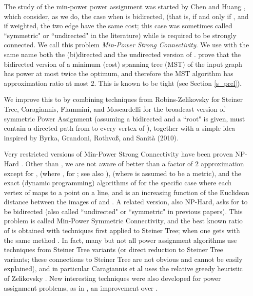 \documentclass[12pt]{article}
\begin{document}
The study of the min-power power assignment 
was started by Chen and Huang \cite{CH89}, which consider, as we do,
the case when  is bidirected,
(that is,  if and only if , and if weighted, the two
edge have the same cost;
this case was sometimes called ``symmetric" or  ``undirected" in the literature)
while  is required to be strongly connected. 
We call this problem {\em Min-Power Strong Connectivity}.
We use with the same name both the (bi)directed and 
the undirected version of .
\cite{CH89} prove that the bidirected version
of a minimum (cost) spanning tree (MST)
of the input graph  has power at most twice the optimum,
and therefore the MST algorithm has approximation ratio at most 2.
This is known to be tight (see Section \ref{s_prel}).

We improve this to  
by combining techniques from Robins-Zelikovsky 
\cite{RZ00,RobinsZ05} for Steiner Tree, 
Caragiannis, Flammini, and Moscardelli \cite{CFM07}
for the broadcast version of symmetric Power Assignment
(assuming a bidirected  and a ``root"  is given,
 must contain a directed path from  to every vertex of ),
together with a simple idea inspired by
Byrka, Grandoni, Rothvo\ss, and Sanit\`{a} (2010).

Very restricted versions of Min-Power Strong Connectivity
have been proven NP-Hard \cite{KKKP00,CPS00,CK07}. Other than \cite{C10},
we are not aware
of better than a factor of 2 approximation except for \cite{CK07},
(where , for ; see also \cite{C10}),
\cite{CCPRS05} (where  is assumed to be a metric), and
the exact (dynamic programming) algorithms of
\cite{KKKP00} for the specific case
where each vertex of  maps to a point on a line, and  is an
increasing function of the Euclidean distance 
between the images of  and .
A related version, also NP-Hard, asks for  to be bidirected 
(also called ``undirected" or ``symmetric" in previous papers).
This problem is called Min-Power Symmetric Connectivity, 
and the best known ratio of  \cite{ACMPTZ06} is obtained with
techniques first applied to Steiner Tree;
when  one gets  with the same method
\cite{NY09}. In fact, many but not all power assignment 
algorithms use techniques from Steiner Tree variants
(or direct reduction to Steiner Tree variants; these connections 
to Steiner Tree are not obvious and cannot be easily explained), 
and in particular
Caragiannis et al \cite{CFM07} uses the relative greedy
heuristic of Zelikovsky \cite{Z96}. New interesting techniques were also
developed for power assignment problems, as in
\cite{KortsarzMNT08}, an improvement over \cite{HajiaghayiKMN07}.
\end{document}
